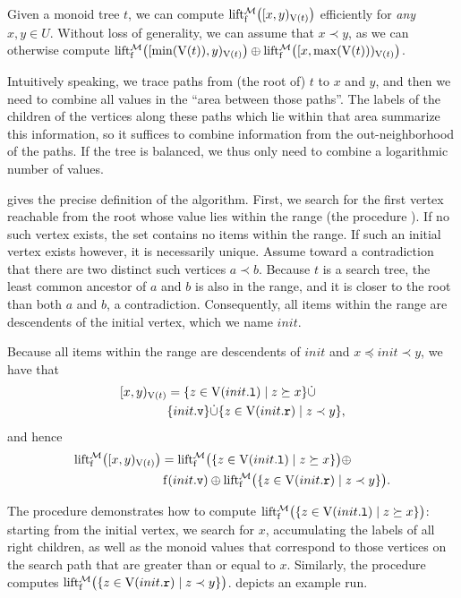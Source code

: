 \documentclass[conference]{IEEEtran}
\begin{document}
Given a monoid tree $t$, we can compute $\operatorname{lift_{\operatorname{f}}^{\mathcal{M}}}\bigl([{x},{y})_{\operatorname{V}(t)}\bigr)$ efficiently for \textit{any} $x, y \in U$. Without loss of generality, we can assume that $x \prec y$, as we can otherwise compute $\operatorname{lift_{\operatorname{f}}^{\mathcal{M}}}\bigl([{\min(\operatorname{V}(t))},{y})_{\operatorname{V}(t)}\bigr) \oplus \operatorname{lift_{\operatorname{f}}^{\mathcal{M}}}\bigl([{x},{\max(\operatorname{V}(t))})_{\operatorname{V}(t)}\bigr)$.

Intuitively speaking, we trace paths from (the root of) $t$ to $x$ and $y$, and then we need to combine all values in the ``area between those paths''. The labels of the children of the vertices along these paths which lie within that area summarize this information, so it suffices to combine information from the out-neighborhood of the paths. If the tree is balanced, we thus only need to combine a logarithmic number of values.

 gives the precise definition of the algorithm. First, we search for the first vertex reachable from the root whose value lies within the range (the procedure ). If no such vertex exists, the set contains no items within the range. If such an initial vertex exists however, it is necessarily unique. Assume toward a contradiction that there are two distinct such vertices $a \prec b$. Because $t$ is a search tree, the least common ancestor of $a$ and $b$ is also in the range, and it is closer to the root than both $a$ and $b$, a contradiction. Consequently, all items within the range are descendents of the initial vertex, which we name $init$.

Because all items within the range are descendents of $init$ and $x \preceq init \prec y$, we have that \begin{align*}
	[{x},{y})_{\operatorname{V}(t)} &= \{z \in \operatorname{V}({init}\mathtt{.l}) \mid z \succeq x\} \dot{\cup}\\
	&\{{init}\mathtt{.v}\} \dot{\cup} \{z \in \operatorname{V}({init}\mathtt{.r}) \mid z \prec y\},
\end{align*} and hence \begin{align*}
	\operatorname{lift_{\operatorname{f}}^{\mathcal{M}}}\bigl([{x},{y})_{\operatorname{V}(t)}\bigr) &= \operatorname{lift_{\operatorname{f}}^{\mathcal{M}}}\bigl(\{z \in \operatorname{V}({init}\mathtt{.l}) \mid z \succeq x\}\bigr) \oplus\\
	&\operatorname{f}({init}\mathtt{.v}) \oplus \operatorname{lift_{\operatorname{f}}^{\mathcal{M}}}\bigl(\{z \in \operatorname{V}({init}\mathtt{.r}) \mid z \prec y\}\bigr).
\end{align*}

The procedure  demonstrates how to compute $\operatorname{lift_{\operatorname{f}}^{\mathcal{M}}}\bigl(\{z \in \operatorname{V}({init}\mathtt{.l}) \mid z \succeq x\}\bigr)$: starting from the initial vertex, we search for $x$, accumulating the labels of all right children, as well as the monoid values that correspond to those vertices on the search path that are greater than or equal to $x$. Similarly, the procedure  computes $\operatorname{lift_{\operatorname{f}}^{\mathcal{M}}}\bigl(\{z \in \operatorname{V}({init}\mathtt{.r}) \mid z \prec y\}\bigr)$.  depicts an example run.
\end{document}
